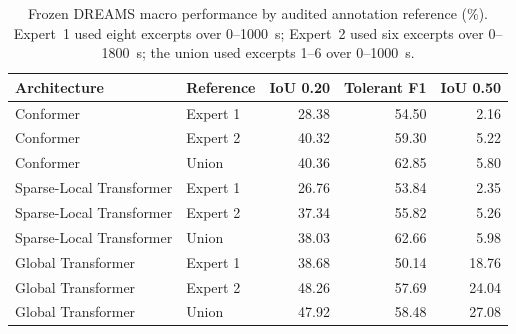 \begin{table}[!t]
\centering
\caption{Frozen DREAMS macro performance by audited annotation reference (\%). Expert~1 used eight excerpts over 0--1000~s; Expert~2 used six excerpts over 0--1800~s; the union used excerpts 1--6 over 0--1000~s.}
\label{tab:dreams-reference-sensitivity}
\footnotesize
\begin{tabular}{llrrr}
\toprule
Architecture & Reference & IoU 0.20 & Tolerant F1 & IoU 0.50 \\
\midrule
Conformer & Expert 1 & 28.38 & 54.50 & 2.16 \\
Conformer & Expert 2 & 40.32 & 59.30 & 5.22 \\
Conformer & Union & 40.36 & 62.85 & 5.80 \\
Sparse-Local Transformer & Expert 1 & 26.76 & 53.84 & 2.35 \\
Sparse-Local Transformer & Expert 2 & 37.34 & 55.82 & 5.26 \\
Sparse-Local Transformer & Union & 38.03 & 62.66 & 5.98 \\
Global Transformer & Expert 1 & 38.68 & 50.14 & 18.76 \\
Global Transformer & Expert 2 & 48.26 & 57.69 & 24.04 \\
Global Transformer & Union & 47.92 & 58.48 & 27.08 \\
\bottomrule
\end{tabular}
\end{table}
